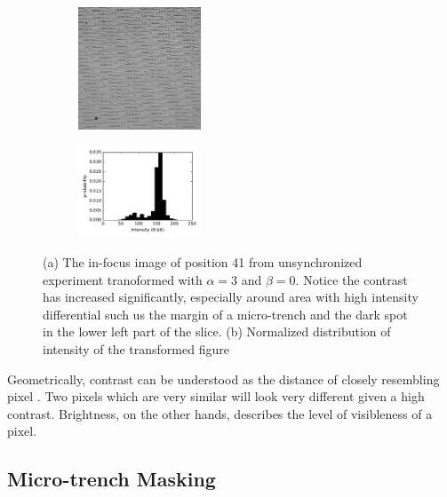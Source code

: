 \documentclass[pdftex,12pt,a4paper]{report}
\begin{document}
\begin{figure}[H]
\centering

\begin{subfigure}{\textwidth}
  \centering
  \includegraphics[width=0.4\textwidth]{images/pos_41_in_t0_br_times3}
  \caption{}
  \label{fig:pos41_times3_bf}
\end{subfigure}%

\begin{subfigure}{\textwidth}
  \centering
  \includegraphics[width=0.4\textwidth]{images/pos_41_in_t0_br_times3_hist}
  \caption{}
  \label{fig:pos41_times3_hist}
\end{subfigure}%

\label{fig:pos41_times3}
\caption{(a) The in-focus image of position 41 from unsynchronized experiment tranoformed with $\alpha=3$ and $\beta = 0$. Notice the contrast has increased significantly, especially around area with high intensity differential such us the margin of a micro-trench and the dark spot in the lower left part of the slice. (b) Normalized distribution of intensity of the transformed figure}
\end{figure}

Geometrically, contrast can be understood as the distance of closely resembling pixel \cite{hartley2003multiple}. Two pixels which are very similar will look very different given a high contrast. Brightness, on the other hands, describes the level of visibleness of a pixel.

\subsection{Micro-trench Masking}
\label{subsection:micro_trench_masking}
\end{document}

